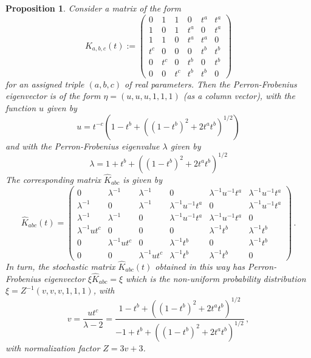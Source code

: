 \documentclass[12pt]{amsart}
\newtheorem{prop}{Proposition}[section]
\numberwithin{equation}{section}
\begin{document}
\begin{prop}\label{ulambdalem}
Consider a matrix of the form 
\begin{equation}\label{Kabc}
 K_{a,b,c}(t):= \begin{pmatrix} 0 & 1 & 1 & 0 & t^a & t^a  \\
1 & 0 & 1 & t^a  & 0 & t^a  \\
1 & 1 & 0 & t^a  & t^a  & 0 \\
t^c & 0 & 0 & 0 & t^b  & t^b   \\
0 & t^c & 0 & t^b   & 0 & t^b   \\
0 & 0 & t^c & t^b   & t^b   & 0 
\end{pmatrix}  
\end{equation}
for an assigned triple $(a,b,c)$ of real parameters. Then the Perron-Frobenius eigenvector is of
the form $\eta=(u,u,u,1,1,1)$ (as a 
column vector), with the function $u$ given by
\begin{equation}\label{uabc}
u = t^{-c} (1-t^b + ((1-t^b)^2 + 2 t^a t^b )^{1/2} )
\end{equation}
and with the Perron-Frobenius eigenvalue $\lambda$ given by
 \begin{equation}\label{abclambda}
 \lambda = 1 + t^b + ((1-t^b)^2 + 2 t^a t^b )^{1/2} 
 \end{equation}
The corresponding matrix $\hat K_{abc}$ is given by
\begin{equation}\label{hatKabc}
 \hat K_{abc}(t) = 
\begin{pmatrix} 0 & \lambda^{-1} & \lambda^{-1} & 0 & \lambda^{-1} u^{-1} t^a
& \lambda^{-1} u^{-1} t^a \\
\lambda^{-1} & 0 & \lambda^{-1} & \lambda^{-1} u^{-1} t^a & 
0 & \lambda^{-1} u^{-1} t^a \\ 
\lambda^{-1}  & \lambda^{-1}  & 0 & 
\lambda^{-1} u^{-1} t^a & \lambda^{-1} u^{-1} t^a & 0 \\
\lambda^{-1} u t^c & 0 & 0 & 0 & \lambda^{-1} t^b & \lambda^{-1} t^b \\
0 & \lambda^{-1} u t^c & 0 & \lambda^{-1} t^b & 0 & \lambda^{-1} t^b \\
0 & 0 & \lambda^{-1} u t^c & \lambda^{-1} t^b & \lambda^{-1}t^b & 0 
\end{pmatrix} \, . 
\end{equation} 
In turn, the stochastic matrix $\hat K_{abc}(t)$ obtained in this way has 
Perron-Frobenius eigenvector $\xi \hat K_{abc}=\xi$ which is the non-uniform
probability distribution  $\xi=Z^{-1}(v,v,v,1,1,1)$, with 
$$ v=\frac{u t^c}{\lambda-2} = \frac{1-t^b + ((1-t^b)^2 + 2 t^a t^b )^{1/2}}{-1+t^b  + ((1-t^b)^2 + 2 t^a t^b )^{1/2}} \, , $$
with normalization factor $Z=3v +3$. 
\end{prop}
\end{document}
